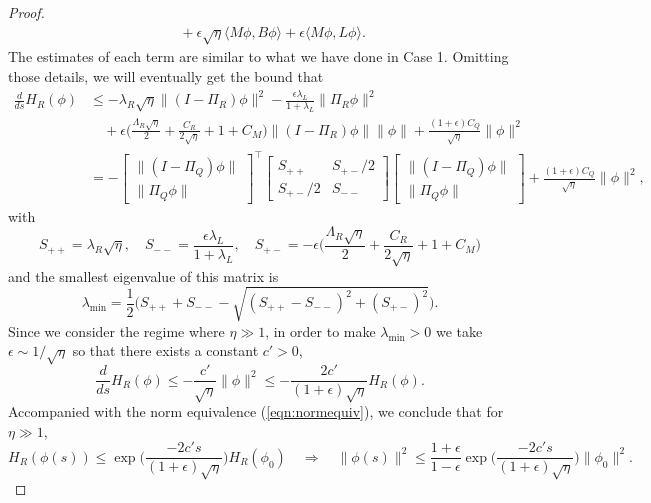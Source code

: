 \documentclass[11pt]{article}
\newcommand{\1}{\mathds{1}}
\begin{document}
\begin{proof}
\begin{equation}
\begin{aligned}
        &\quad +\epsilon\sqrt{\eta}\langle M\phi, B\phi\rangle+\epsilon\langle M\phi, L \phi\rangle.
    \end{aligned}
\end{equation}
The estimates of each term are similar to what we have done in Case 1. Omitting those details, we will eventually get the bound that
\begin{equation}
\begin{aligned}
    \frac{d}{ds} H_R(\phi) &\leq -\lambda_R\sqrt{\eta}\|(I-\Pi_R)\phi\|^2-\frac{\epsilon\lambda_L}{1+\lambda_L} \|\Pi_R\phi\|^2\\
    &\quad+\epsilon\Big(\frac{\Lambda_R \sqrt{\eta}}{2}+\frac{C_R}{2\sqrt{\eta}}+1+C_M\Big)\|(I-\Pi_R)\phi\|\|\phi\|
  + \frac{(1+\epsilon)C_Q}{\sqrt{\eta}} \|\phi\|^2\\
    & = -\begin{bmatrix}
            \|(I-\Pi_Q)\phi\| \\
            \|\Pi_Q\phi\|
        \end{bmatrix}^\top \begin{bmatrix}
            S_{++} & S_{+-}/2\\
          S_{+-}/2 & S_{--}
        \end{bmatrix} \begin{bmatrix}
            \|(I-\Pi_Q)\phi\| \\
            \|\Pi_Q\phi\| 
        \end{bmatrix}+ \frac{(1+\epsilon) C_Q}{\sqrt{\eta}} \|\phi\|^2,
\end{aligned}
\end{equation}
with \begin{equation}
    S_{++} = \lambda_R\sqrt{\eta}, \quad S_{--} = \frac{\epsilon\lambda_L}{1+\lambda_L} , \quad S_{+-} = - \epsilon\Big(\frac{\Lambda_R \sqrt{\eta}}{2}+\frac{C_R}{2\sqrt{\eta}}+1+C_M\Big)
\end{equation}
and the smallest eigenvalue of this matrix is
\begin{equation}
    \lambda_{\min} = \frac{1}{2}\Big(S_{++} + S_{--}-\sqrt{(S_{++}-S_{--})^2+(S_{+-})^2}\Big).
\end{equation}
Since we consider the regime where $\eta\gg 1$, in order to make $\lambda_{\min}>0$ we take $\epsilon \sim 1/\sqrt{\eta}$ so that there exists a constant $c'>0$,
\begin{equation}
     \frac{d}{ds} H_R(\phi) \leq -\frac{c'}{\sqrt{\eta}} \|\phi\|^2\leq -\frac{2c'}{(1+\epsilon)\sqrt{\eta}} H_R(\phi).
\end{equation}
Accompanied with the norm equivalence (\ref{eqn:normequiv}), we conclude that for $\eta\gg1$, 
\begin{equation}
    H_R(\phi(s))\leq \exp\Big(\frac{-2c's}{(1+\epsilon)\sqrt{\eta}}\Big) H_R(\phi_0) \quad \Longrightarrow \quad \|\phi(s)\|^2 \leq \frac{1+\epsilon}{1-\epsilon}\exp\Big(\frac{-2c's}{(1+\epsilon)\sqrt{\eta}}\Big) \|\phi_0\|^2.
\end{equation}
\end{proof}
\end{document}
